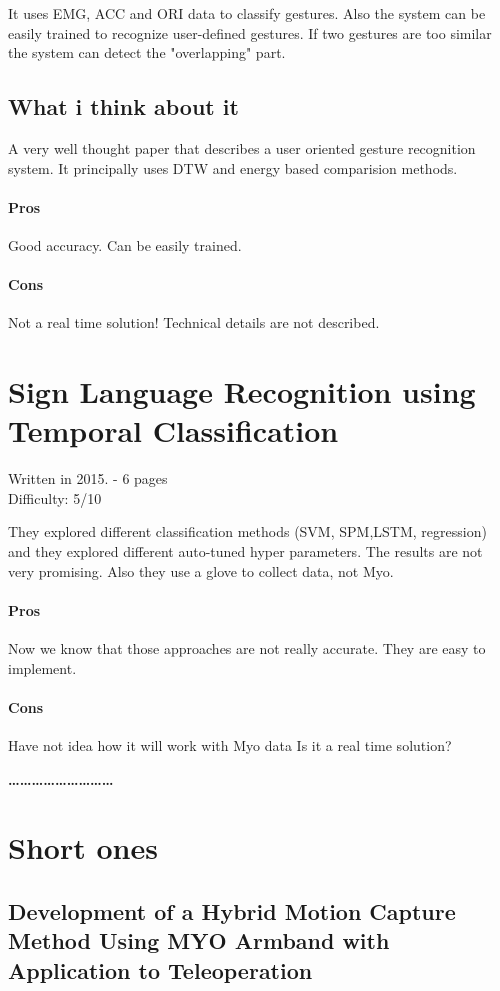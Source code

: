 \documentclass{article}
\begin{document}
It uses EMG, ACC and ORI data to classify gestures. Also the system can be easily trained to recognize user-defined gestures. If two gestures are too similar the system can detect the "overlapping" part.

\subsection{What i think about it}
A very well thought paper that describes a user oriented gesture recognition system. It principally uses DTW and energy based comparision methods.
\paragraph{Pros}
Good accuracy.
Can be easily trained.
\paragraph{Cons}
Not a real time solution!
Technical details are not described.

\section{Sign Language Recognition using Temporal Classification}
Written in 2015. - 6 pages\\
Difficulty: 5/10

They explored different classification methods (SVM, SPM,LSTM, regression) and they explored different auto-tuned  hyper parameters. The results are not very promising. 
Also they use  a glove to collect data, not Myo.

\paragraph{Pros}
Now we know that those approaches are not really accurate.
They are easy to implement.
\paragraph{Cons}
Have not idea how it will work with Myo data
Is it a real time solution?

\textbf{\ldots\ldots\ldots\ldots\ldots\ldots\ldots\ldots\ldots}
\section{Short ones}

\subsection{Development of a Hybrid Motion Capture Method Using MYO Armband with Application to Teleoperation}
\end{document}
